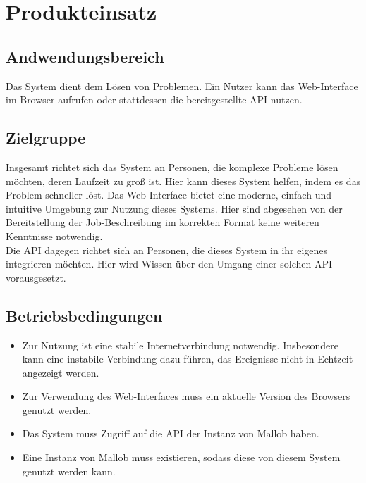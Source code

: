 \section{Produkteinsatz}

\subsection{Andwendungsbereich}

Das System dient dem Lösen von Problemen. Ein Nutzer kann das Web-Interface im Browser aufrufen oder stattdessen die bereitgestellte API nutzen.
\subsection{Zielgruppe}

Insgesamt richtet sich das System an Personen, die komplexe Probleme lösen möchten, deren Laufzeit zu groß ist. Hier kann dieses System helfen, indem es das Problem schneller löst. 
Das Web-Interface bietet eine moderne, einfach und intuitive Umgebung zur Nutzung dieses Systems. Hier sind abgesehen von der Bereitstellung der Job-Beschreibung im korrekten Format keine weiteren Kenntnisse notwendig. \\
Die API dagegen richtet sich an Personen, die dieses System in ihr eigenes integrieren möchten. Hier wird Wissen über den Umgang einer solchen API vorausgesetzt. 
\subsection{Betriebsbedingungen}

\begin{itemize}
    \item Zur Nutzung ist eine stabile Internetverbindung notwendig. Insbesondere kann eine instabile Verbindung dazu führen, das Ereignisse nicht in Echtzeit angezeigt werden.
    \item Zur Verwendung des Web-Interfaces muss ein aktuelle Version des Browsers genutzt werden.
    \item Das System muss Zugriff auf die API der Instanz von Mallob haben.
    \item Eine Instanz von Mallob muss existieren, sodass diese von diesem System genutzt werden kann. 
\end{itemize}